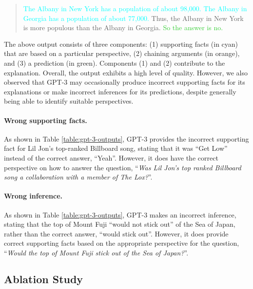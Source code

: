 \begin{quote}
\textcolor{cyan}{The Albany in New York has a population of about 98,000. The Albany in Georgia has a population of about 77,000.} \textcolor{YellowOrange}{Thus, the Albany in New York is more populous than the Albany in Georgia.} \textcolor{LimeGreen}{So the answer is no.}
\end{quote}

The above output consists of three components: (1) supporting facts (in cyan) that are based on a particular perspective, (2) chaining arguments (in orange), and (3) a prediction (in green). Components (1) and (2) contribute to the explanation. Overall, the output exhibits a high level of quality. However, we also observed that GPT-3 may occasionally produce incorrect supporting facts for its explanations or make incorrect inferences for its predictions, despite generally being able to identify suitable perspectives. 

\paragraph{Wrong supporting facts.} As shown in Table \ref{table:gpt-3-outputs}, GPT-3 provides the incorrect supporting fact for Lil Jon's top-ranked Billboard song, stating that it was ``Get Low'' instead of the correct answer, ``Yeah''. However, it does have the correct perspective on how to answer the question, ``\textit{Was Lil Jon’s top ranked Billboard song a collaboration with a member of
The Lox?}''.

\paragraph{Wrong inference.} As shown in Table \ref{table:gpt-3-outputs}, GPT-3 makes an incorrect inference, stating that the top of Mount Fuji ``would not stick out'' of the Sea of Japan, rather than the correct answer, ``would stick out''. However, it does provide correct supporting facts based on the appropriate perspective for the question, ``\textit{Would the top of Mount Fuji stick out of the Sea of Japan?}''. 

\subsection{Ablation Study}


\begin{table}[t]
\centering
{}
\caption{Comparison of query-based and decomposition-based retrieval on commonsense and tabular reasoning.
}
\label{table:retrieval-analysis}
\end{table} 

